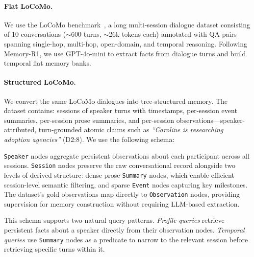 \documentclass{article}
\theoremstyle{definition}
\begin{document}
\paragraph{Flat LoCoMo.}
We use the LoCoMo benchmark~\citep{maharana2024evaluating}, a long multi-session dialogue dataset consisting of 10 conversations ($\sim$600 turns, $\sim$26k tokens each) annotated with QA pairs spanning single-hop, multi-hop, open-domain, and temporal reasoning. Following Memory-R1, we use GPT-4o-mini to extract facts from dialogue turns and build temporal flat memory banks.

\paragraph{Structured LoCoMo.}
We convert the same LoCoMo dialogues into tree-structured memory.
The dataset contains: sessions of speaker turns with timestamps, per-session event summaries, per-session prose summaries, and per-session observations---speaker-attributed, turn-grounded atomic claims such as \textit{``Caroline is researching adoption agencies''} (D2:8). We use the following schema:


\texttt{Speaker} nodes aggregate persistent observations about each participant across all sessions. \texttt{Session} nodes preserve the raw conversational record alongside two levels of derived structure: dense prose \texttt{Summary} nodes, which enable efficient session-level semantic filtering, and sparse \texttt{Event} nodes capturing key milestones. The dataset's gold observations map directly to \texttt{Observation} nodes, providing supervision for memory construction without requiring LLM-based extraction.

This schema supports two natural query patterns. \textit{Profile queries} retrieve persistent facts about a speaker directly from their observation nodes. \textit{Temporal queries} use \texttt{Summary} nodes as a predicate to narrow to the relevant session before retrieving specific turns within it.
\end{document}
